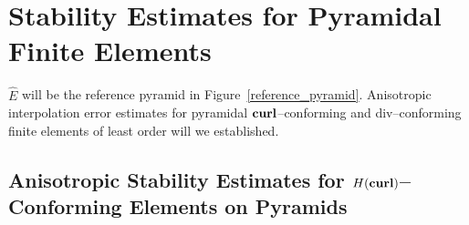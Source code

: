 \section{Stability Estimates for Pyramidal Finite Elements} %
\label{sec:pyramidal_finite_elements}
$\hat{E}$ will be the reference pyramid  in Figure~\ref{reference_pyramid}.
Anisotropic interpolation error estimates for pyramidal $\textbf{curl}$--conforming
and div--conforming finite elements of least order will we established.
\subsection{Anisotropic Stability Estimates for $H(\textbf{curl})$--Conforming 
Elements on Pyramids} %
\label{sub:edge_elements}

